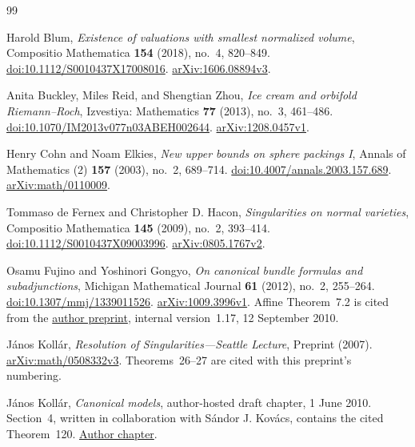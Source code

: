 \documentclass[11pt]{article}
\theoremstyle{definition}
\theoremstyle{remark}
\numberwithin{equation}{section}
\begin{document}
\clearpage
{}
{}
\begin{thebibliography}{99}
\raggedright

Harold Blum,
\emph{Existence of valuations with smallest normalized volume},
Compositio Mathematica \textbf{154} (2018), no.~4, 820--849.
\href{https://doi.org/10.1112/S0010437X17008016}{doi:10.1112/S0010437X17008016}.
\href{https://arxiv.org/abs/1606.08894v3}{arXiv:1606.08894v3}.

Anita Buckley, Miles Reid, and Shengtian Zhou,
\emph{Ice cream and orbifold Riemann--Roch},
Izvestiya: Mathematics \textbf{77} (2013), no.~3, 461--486.
\href{https://doi.org/10.1070/IM2013v077n03ABEH002644}{doi:10.1070/IM2013v077n03ABEH002644}.
\href{https://arxiv.org/abs/1208.0457v1}{arXiv:1208.0457v1}.

Henry Cohn and Noam Elkies,
\emph{New upper bounds on sphere packings I},
Annals of Mathematics (2) \textbf{157} (2003), no.~2, 689--714.
\href{https://doi.org/10.4007/annals.2003.157.689}{doi:10.4007/annals.2003.157.689}.
\href{https://arxiv.org/abs/math/0110009}{arXiv:math/0110009}.

Tommaso de Fernex and Christopher D. Hacon,
\emph{Singularities on normal varieties},
Compositio Mathematica \textbf{145} (2009), no.~2, 393--414.
\href{https://doi.org/10.1112/S0010437X09003996}{doi:10.1112/S0010437X09003996}.
\href{https://arxiv.org/abs/0805.1767v2}{arXiv:0805.1767v2}.

Osamu Fujino and Yoshinori Gongyo,
\emph{On canonical bundle formulas and subadjunctions},
Michigan Mathematical Journal \textbf{61} (2012), no.~2, 255--264.
\href{https://doi.org/10.1307/mmj/1339011526}{doi:10.1307/mmj/1339011526}.
\href{https://arxiv.org/abs/1009.3996v1}{arXiv:1009.3996v1}.
Affine Theorem~7.2 is cited from the \href{https://www.math.kyoto-u.ac.jp/~fujino/subadjunction5.pdf}{author preprint}, internal version~1.17, 12 September 2010.

J\'anos Koll\'ar,
\emph{Resolution of Singularities---Seattle Lecture},
Preprint (2007).
\href{https://arxiv.org/abs/math/0508332v3}{arXiv:math/0508332v3}.
Theorems~26--27 are cited with this preprint's numbering.

J\'anos Koll\'ar,
\emph{Canonical models},
author-hosted draft chapter, 1 June 2010.
Section~4, written in collaboration with S\'andor J. Kov\'acs, contains the cited Theorem~120.
\href{https://web.math.princeton.edu/~kollar/book/chap2.pdf}{Author chapter}.


\end{thebibliography}
\end{document}

